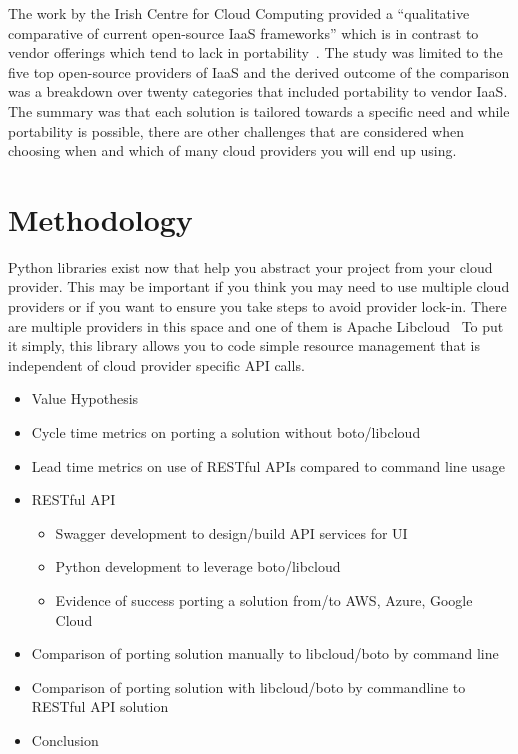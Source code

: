 The work by the Irish Centre for Cloud Computing provided a ``qualitative  comparative  
of current  open-source  IaaS frameworks'' which is in contrast to vendor offerings which
tend to lack in portability~\cite{hid-sp18-518-Comp-study}. The study was limited to the
five top open-source providers of IaaS and the derived outcome of the comparison was a 
breakdown over twenty categories that included portability to vendor IaaS. The summary
was that each solution is tailored towards a specific need and while portability is
possible, there are other challenges that are considered when choosing when and which
of many cloud providers you will end up using.

\section{Methodology}

Python libraries exist now that help you abstract your project from  your cloud provider. 
This may be important if you think you may need to use multiple cloud providers or if you 
want to ensure you take steps to avoid provider lock-in. There are multiple providers in 
this space and one of them is Apache Libcloud~\cite{hid-sp18-518-LibCloud} To put it 
simply, this library allows you to code simple resource  management that is independent 
of cloud provider specific API calls.

\begin{itemize}
\item
  Value Hypothesis
\item
  Cycle time metrics on porting a solution without boto/libcloud
\item
  Lead time metrics on use of RESTful APIs compared to command line
  usage
\item
  RESTful API

  \begin{itemize}
    \item
    Swagger development to design/build API services for UI
  \item
    Python development to leverage boto/libcloud
  \item
    Evidence of success porting a solution from/to AWS, Azure, Google
    Cloud
  \end{itemize}
\item
  Comparison of porting solution manually to libcloud/boto by command
  line
\item
  Comparison of porting solution with libcloud/boto by commandline to
  RESTful API solution
\item
  Conclusion
\end{itemize}

